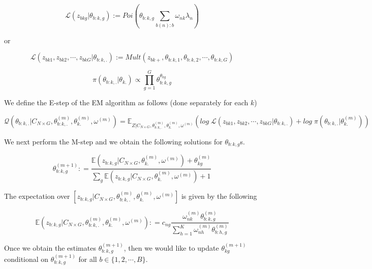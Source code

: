 \documentclass[]{article}
\begin{document}
\begin{equation}
\mathcal{L} (z_{bkg} | \theta_{b:k,g}) := Poi \left (\theta_{b:k,g} \sum_{b(n):b} \omega_{nk}\lambda_{n} \right )  
\label{lab:loglik}
\end{equation}

or

\begin{equation}
\mathcal{L} (z_{bk1}, z_{bk2}, \cdots, z_{bkG} | \theta_{b:k,.}) := Mult \left (z_{bk+}, \theta_{b:k,1}, \theta_{b:k,2}, \cdots, \theta_{b:k,G} \right)
\label{lab:loglik}
\end{equation}

\begin{equation}
\pi(\theta_{b:k,.} | \theta_{k.} ) \propto \prod_{g=1}^{G} \theta_{b:k,g}^{\theta_{kg}}
\label{lab:prior}
\end{equation}

We define the E-step of the EM algorithm as follows (done separately for
each \(k\))

\begin{equation}
\mathcal{Q} \left ( \theta_{b:k,.} | C_{N \times G}, \theta^{(m)}_{b:k,.}, \theta^{(m)}_{k.} , \omega^{(m)} \right ) = \mathbb{E}_{Z | C_{N \times G}, \theta^{(m)}_{b:k,.}, \theta^{(m)}_{k.} , \omega^{(m)}} \left ( log \; \mathcal{L} (z_{bk1}, z_{bk2}, \cdots, z_{bkG} | \theta_{b:k,.})  + log \; \pi(\theta_{b:k,.} | \theta^{(m)}_{k.} ) \right )
\label{lab:estep}
\end{equation}

We next perform the M-step and we obtain the following solutions for
\(\theta_{b:k,g}\)s.

\begin{equation}
\theta^{(m+1)}_{b:k,g} : = \frac{\mathbb{E} \left ( z_{b:k,g} |  C_{N \times G}, \theta^{(m)}_{k.} , \omega^{(m)} \right) + \theta^{(m)}_{kg}}{\sum_{g} \mathbb{E} \left ( z_{b:k,g} |  C_{N \times G}, \theta^{(m)}_{k.} , \omega^{(m)} \right) + 1}
\label{lab:mstep}
\end{equation}

The expectation over
\([ z_{b:k,g} | C_{N \times G}, \theta^{(m)}_{b:k,.}, \theta^{(m)}_{k.} , \omega^{(m)} ]\)
is given by the following

\[ \mathbb{E} \left ( z_{b:k,g} |  C_{N \times G}, \theta^{(m)}_{b:k,.}, \theta^{(m)}_{k.} , \omega^{(m)} \right) : = c_{ng} \frac{\omega^{(m)}_{nk} \theta^{(m)}_{b:k,g}}{\sum_{h=1}^{K} \omega^{(m)}_{nh} \theta^{(m)}_{b:h,g}} \]

Once we obtain the estimates \(\theta^{(m+1)}_{b:k,g}\), then we would
like to update \(\theta^{(m+1)}_{kg}\) conditional on
\(\theta^{(m+1)}_{b:k,g}\) for all \(b \in \{1,2, \cdots, B \}\).
\end{document}
